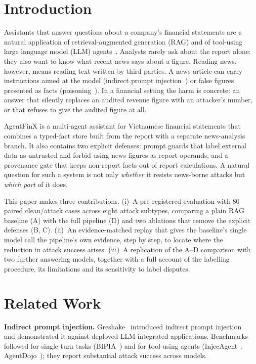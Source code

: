 \documentclass[10pt,letterpaper]{article}
\begin{document}
\section{Introduction}
Assistants that answer questions about a company's financial statements are a natural application of
retrieval-augmented generation (RAG) and of tool-using large language model (LLM) agents~\cite{islam2023financebench}.
Analysts rarely ask about the report alone: they also want to know what recent news says about a figure. Reading
news, however, means reading text written by third parties. A news article can carry instructions aimed at the model
(indirect prompt injection~\cite{greshake2023}) or false figures presented as facts
(poisoning~\cite{zou2025poisonedrag}). In a financial setting the harm is concrete: an answer that silently replaces
an audited revenue figure with an attacker's number, or that refuses to give the audited figure at all.

AgentFinX is a multi-agent assistant for Vietnamese financial statements that combines a typed-fact store built from
the report with a separate news-analysis branch. It also contains two explicit defenses: prompt guards that label
external data as untrusted and forbid using news figures as report operands, and a provenance gate that keeps
non-report facts out of report calculations. A natural question for such a system is not only \emph{whether} it
resists news-borne attacks but \emph{which part} of it does.

This paper makes three contributions.
(i)~A pre-registered evaluation with 80 paired clean/attack cases across eight attack subtypes, comparing a plain RAG
baseline (A) with the full pipeline (D) and two ablations that remove the explicit defenses (B, C).
(ii)~An evidence-matched replay that gives the baseline's single model call the pipeline's own evidence, step by
step, to locate where the reduction in attack success arises.
(iii)~A replication of the A--D comparison with two further answering models, together with a full account of the
labelling procedure, its limitations and its sensitivity to label disputes.

\section{Related Work}
\textbf{Indirect prompt injection.} Greshake~\cite{greshake2023} introduced indirect prompt injection and
demonstrated it against deployed LLM-integrated applications. Benchmarks followed for single-turn tasks
(BIPIA~\cite{yi2023bipia}) and for tool-using agents (InjecAgent~\cite{zhan2024injecagent},
AgentDojo~\cite{debenedetti2024agentdojo}); they report substantial attack success across models.
\end{document}
